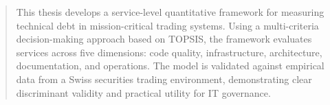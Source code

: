\documentclass[
  11pt,
  letterpaper,
  11pt,
  oneside,
  english,
  onehalfspacing,
  headsepline]{MastersDoctoralThesis}
\begin{document}
\begin{declaration}
\addchaptertocentry{\authorshipname} %


\end{declaration}

\clearpage



\begin{abstract}
\addchaptertocentry{\abstractname} %
This thesis develops a service-level quantitative framework for
measuring technical debt in mission-critical trading systems. Using a
multi-criteria decision-making approach based on TOPSIS, the framework
evaluates services across five dimensions: code quality, infrastructure,
architecture, documentation, and operations. The model is validated
against empirical data from a Swiss securities trading environment,
demonstrating clear discriminant validity and practical utility for IT
governance.
\end{abstract}



\begin{acknowledgements}
\addchaptertocentry{\acknowledgementname} %

\end{acknowledgements}


% 

\begingroup
\hypersetup{linkcolor=black}

\tableofcontents %

\listoffigures %

\listoftables %

\endgroup


\end{document}
